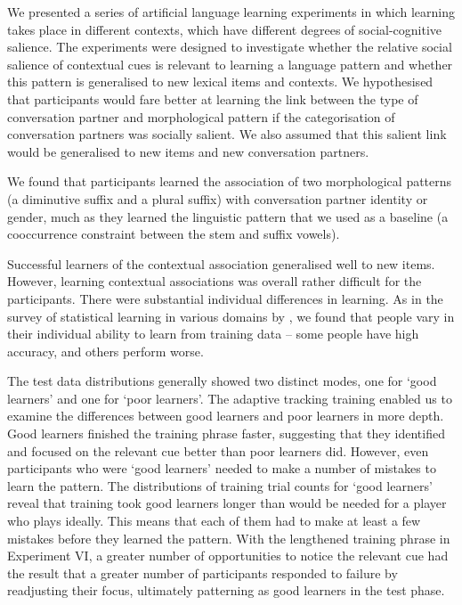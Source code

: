 \documentclass{frontiersSCNS} %
\begin{document}
We presented a series of artificial language learning experiments in which learning takes place in different contexts, which  have different degrees of social-cognitive salience. The experiments were designed to investigate whether the relative social salience of contextual cues is relevant to learning a language pattern and whether this pattern is generalised to new lexical items and contexts. We hypothesised that participants would fare better at learning the link between the type of conversation partner and morphological pattern if the categorisation of conversation partners was socially salient. We also assumed that this salient link would be generalised to new items and new conversation partners.

We found that participants learned the association of two morphological patterns (a diminutive suffix and a plural suffix) with conversation partner identity or gender, much as they learned the linguistic pattern that we used as a baseline (a cooccurrence constraint between the stem and suffix vowels).  

Successful learners of the contextual association generalised well to new items. However, learning contextual associations was overall rather difficult for the participants. There were substantial individual differences in learning.  As in the survey of statistical learning in various domains by \cite{siegelman2015statistical}, we found that people vary in their individual ability to learn from training data -- some people have high accuracy, and others perform worse.

The test data distributions generally showed two distinct modes, one for `good learners' and one for `poor learners'.  The adaptive tracking training enabled us to examine the differences between good learners and poor learners in more depth. Good learners finished the training phrase faster, suggesting that they identified and focused on the relevant cue better than poor learners did. However, even participants who were `good learners' needed to make a number of mistakes to learn the pattern. The distributions of training trial counts for  `good learners' reveal that training took good learners longer than would be needed for a player who plays ideally. This means that each of them had to make at least a few mistakes before they learned the pattern. With the lengthened training phrase in Experiment VI, a greater number of opportunities to notice the relevant cue had the result that a greater number of participants responded to failure by readjusting their focus, ultimately patterning as good learners in the test phase.
\end{document}
